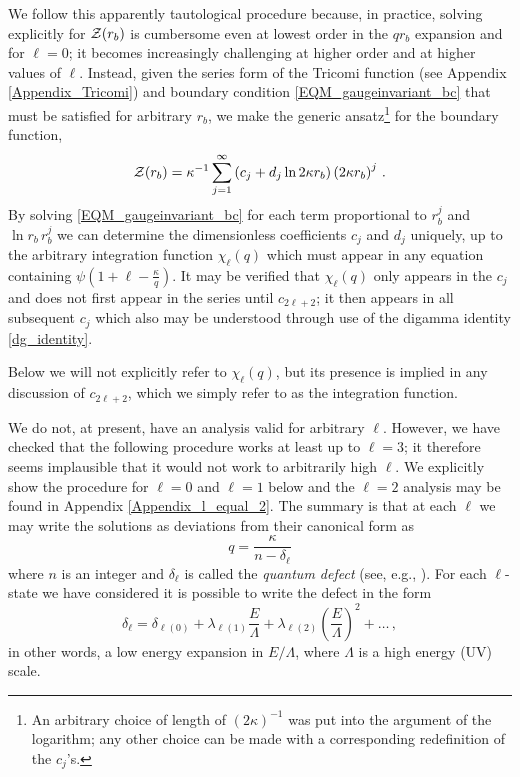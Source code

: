 \documentclass[pra,twocolumn,nofootinbib, superscriptaddress]{revtex4}%
\def\({\left(}
\def\){\right)}
\def\f#1#2{\frac{#1}{#2}}
\def\de{\delta}
\def\k{\kappa}
\def\l{\lambda}
\def\L{\Lambda}
\begin{document}
We follow this apparently tautological procedure because, in practice, solving explicitly for ${\cal Z}(r_b)$ is cumbersome even at lowest order in the $qr_b$ expansion and for $\ell=0$; it becomes increasingly challenging at higher order and at higher values of $\ell$.  Instead, given the series form of the Tricomi function (see Appendix \ref{Appendix_Tricomi}) and boundary condition \eqref{EQM_gaugeinvariant_bc} that must be satisfied for arbitrary $r_b$, we make the generic ansatz\footnote{An arbitrary choice of length of $\(2\k\)^{-1}$ was put into the argument of the logarithm; any other choice can be made with a corresponding redefinition of the $c_j$'s. } for the boundary function,
\begin{equation}\label{Z_ansatz}
{\cal Z}(r_b) = \k^{-1}\sum_{j=1}^\infty \(c_j +d_j \ln{2\k r_b}   \) \(2\k r_b\)^j\,.
\end{equation}
By solving \eqref{EQM_gaugeinvariant_bc} for each term proportional to $r_b^j$ and $\ln{r_b}\,r_b^j$ we can determine the dimensionless coefficients $c_j$ and $d_j$ uniquely, up to the arbitrary integration function $\chi_\ell(q)$ which must appear in any equation containing $\psi\(1+\ell -\f{\k}{q}\)$. It may be verified that $\chi_\ell(q)$ only appears in the $c_j$ and does not first appear in the series until $c_{2\ell+2}$; it then appears in all subsequent $c_j$ which also may be understood through use of the digamma identity \eqref{dg_identity}.


Below we will not explicitly refer to $\chi_\ell(q)$, but its presence is implied in any discussion of $c_{2\ell+2}$, which we simply refer to as the integration function.

We do not, at present, have an analysis valid for arbitrary $\ell$. However, we have checked that the following procedure works at least up to $\ell=3$; it therefore seems implausible that it would not work to arbitrarily high $\ell$. We explicitly show the procedure for $\ell=0$ and $\ell=1$ below and the $\ell=2$ analysis may be found in Appendix \ref{Appendix_l_equal_2}. The summary is that at each $\ell$ we may write the solutions as deviations from their canonical form as
\begin{equation}\label{q_ansatz}
q=\f{\k}{n-\de_\ell}
\end{equation}
where $n$ is an integer and $\de_\ell$ is called the \emph{quantum defect} (see, e.g., \cite{Seaton_1983}). For each $\ell$-state we have considered it is possible to write the defect in the form
\begin{equation}\label{delta_expansion}
\de_\ell = \de_{\ell(0)}+\l_{\ell(1)} \f{E}{\L} + \l_{\ell(2)} \(\f{E}{\L}\)^2 + \dots\,,
\end{equation}
in other words, a low energy expansion in $E/\L$, where $\L$ is a high energy (UV) scale.
\end{document}
